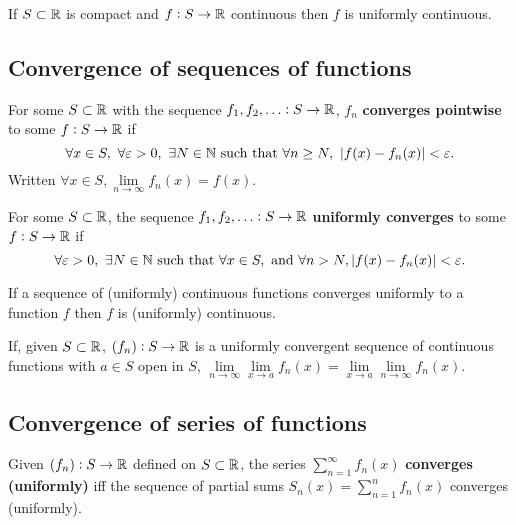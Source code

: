 \documentclass[../Year1.tex]{subfiles}
\begin{document}
\begin{theorem}
    If $S\subset\mathbb{R}$ is compact and $f:S\rightarrow\mathbb{R}$ continuous then $f$ is uniformly continuous.
\end{theorem}

\subsection{Convergence of sequences of functions}

\begin{definition}
    For some $S\subset\mathbb{R}$ with the sequence $f_1,f_2,\ldots:S\rightarrow \mathbb{R}$, $f_n$ \textbf{converges pointwise} to some $f:S\rightarrow\mathbb{R}$ if \[
        \forall x\in S,\ \forall\epsilon>0, \  \exists N\in\NN \ \text{\textcolor{black}{such that }}  \forall n\geq N, \ |f(x)-f_n(x)|<\epsilon
    \textcolor{black}{.}
    \] Written $\forall x\in S, \lim\limits_{n\rightarrow\infty}f_n(x)=f(x)$.
\end{definition}

\begin{definition}
    For some $S\subset\mathbb{R}$, the sequence $f_1,f_2,\ldots:S\rightarrow \mathbb{R}$ \textbf{uniformly converges} to some $f:S\rightarrow\mathbb{R}$ if\[
        \forall\epsilon>0, \ \exists N\in\NN  \ \text{\textcolor{black}{such that }} \forall x\in S, \ \text{\textcolor{black}{and }} \forall n>N, |f(x)-f_n(x)|<\epsilon
    \textcolor{black}{.}
    \]
\end{definition}

\begin{theorem}
    If a sequence of (uniformly) continuous functions converges uniformly to a function $f$ then $f$ is (uniformly) continuous.
\end{theorem}

\begin{theorem}
    If, given $S\subset\mathbb{R}$, $(f_n):S\rightarrow\mathbb{R}$ is a uniformly convergent sequence of continuous functions with $a\in S$ open in $S$, $\lim\limits_{n\rightarrow\infty}\lim\limits_{x\rightarrow a}f_n(x)=\lim\limits_{x\rightarrow a}\lim\limits_{n\rightarrow\infty}f_n(x)$.
\end{theorem}

\subsection{Convergence of series of functions}

\begin{definition}
    Given $(f_n):S\rightarrow\mathbb{R}$ defined on $S\subset\mathbb{R}$, the series $\displaystyle\sum_{n=1}^\infty f_n(x)$ \textbf{converges (uniformly)} iff the sequence of partial sums $S_n(x)=\displaystyle\sum_{n=1}^n f_n(x)$ converges (uniformly).
\end{definition}
\end{document}

